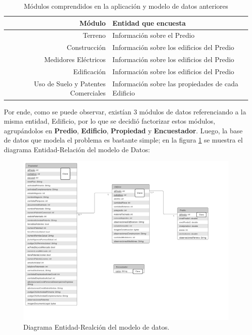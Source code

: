 \begin{table}[h!]
\centering
\caption{Módulos comprendidos en la aplicación y modelo de datos anteriores}
\label{tab:modulosAnteriores} %
\begin{tabular}{|r|l|}
    \toprule
    \textbf{Módulo}                     & \textbf{Entidad que encuesta}                      \\
    \midrule
    Terreno                             & Información sobre el Predio                        \\
    Construcción                        & Información sobre los edificios del Predio         \\
    Medidores Eléctricos                & Información sobre los edificios del Predio         \\
    Edificación                         & Información sobre los edificios del Predio         \\
    Uso de Suelo y Patentes Comerciales & Información sobre las propiedades de cada Edificio \\
    \bottomrule %
\end{tabular}
\end {table}
Por ende, como se puede observar, existían 3 módulos de datos referenciando a la misma entidad, Edificio, por lo que se decidió factorizar estos módulos, agrupándolos en
\textbf{Predio}, \textbf{Edificio}, \textbf{Propiedad} y \textbf{Encuestador}.
Luego, la base de datos que modela el problema es bastante simple; en la figura \ref{fig:figura15} se muestra el diagrama Entidad-Relación del modelo de Datos:
\pagebreak
\begin{figure}[h]
    \centering
    \includegraphics[scale=0.5]{Graphics/Capitulo 3/DiagramaER.png}
    \caption{Diagrama Entidad-Realción del modelo de datos.} %
    \label{fig:figura15}
\end{figure}
